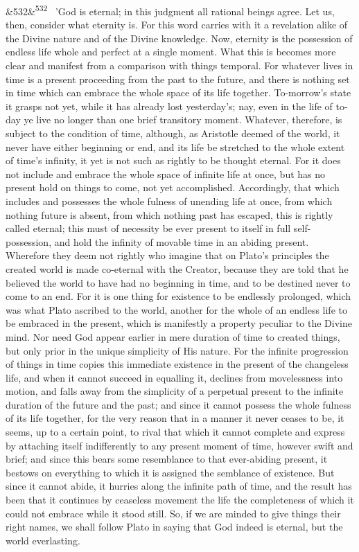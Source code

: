 \documentclass[12pt]{article}
\newcommand{\para}[1][]{\par\noindent\ifx&#1&\else\textsuperscript{\footnotesize #1}~\fi}
\begin{document}
\para[532] 'God is eternal; in this judgment all rational beings agree. Let us, then, consider what eternity is. For this word carries with it a revelation alike of the Divine nature and of the Divine knowledge. Now, eternity is the possession of endless life whole and perfect at a single moment. What this is becomes more clear and manifest from a comparison with things temporal. For whatever lives in time is a present proceeding from the past to the future, and there is nothing set in time which can embrace the whole space of its life together. To-morrow's state it grasps not yet, while it has already lost yesterday's; nay, even in the life of to-day ye live no longer than one brief transitory moment. Whatever, therefore, is subject to the condition of time, although, as Aristotle deemed of the world, it never have either beginning or end, and its life be stretched to the whole extent of time's infinity, it yet is not such as rightly to be thought eternal. For it does not include and embrace the whole space of infinite life at once, but has no present hold on things to come, not yet accomplished. Accordingly, that which includes and possesses the whole fulness of unending life at once, from which nothing future is absent, from which nothing past has escaped, this is rightly called eternal; this must of necessity be ever present to itself in full self-possession, and hold the infinity of movable time in an abiding present. Wherefore they deem not rightly who imagine that on Plato's principles the created world is made co-eternal with the Creator, because they are told that he believed the world to have had no beginning in time, and to be destined never to come to an end. For it is one thing for existence to be endlessly prolonged, which was what Plato ascribed to the world, another for the whole of an endless life to be embraced in the present, which is manifestly a property peculiar to the Divine mind. Nor need God appear earlier in mere duration of time to created things, but only prior in the unique simplicity of His nature. For the infinite progression of things in time copies this immediate existence in the present of the changeless life, and when it cannot succeed in equalling it, declines from movelessness into motion, and falls away from the simplicity of a perpetual present to the infinite duration of the future and the past; and since it cannot possess the whole fulness of its life together, for the very reason that in a manner it never ceases to be, it seems, up to a certain point, to rival that which it cannot complete and express by attaching itself indifferently to any present moment of time, however swift and brief; and since this bears some resemblance to that ever-abiding present, it bestows on everything to which it is assigned the semblance of existence. But since it cannot abide, it hurries along the infinite path of time, and the result has been that it continues by ceaseless movement the life the completeness of which it could not embrace while it stood still. So, if we are minded to give things their right names, we shall follow Plato in saying that God indeed is eternal, but the world everlasting.
\end{document}
